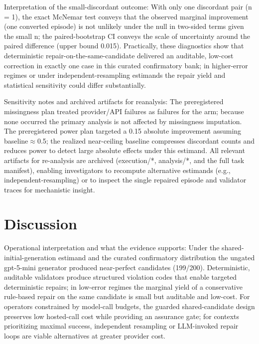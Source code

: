 \documentclass[conference]{IEEEtran}
\begin{document}
Interpretation of the small-discordant outcome: With only one discordant pair (n = 1), the exact McNemar test conveys that the observed marginal improvement (one converted episode) is not unlikely under the null in two-sided terms given the small n; the paired-bootstrap CI conveys the scale of uncertainty around the paired difference (upper bound 0.015). Practically, these diagnostics show that deterministic repair-on-the-same-candidate delivered an auditable, low-cost correction in exactly one case in this curated confirmatory bank; in higher-error regimes or under independent-resampling estimands the repair yield and statistical sensitivity could differ substantially.

Sensitivity notes and archived artifacts for reanalysis: The preregistered missingness plan treated provider/API failures as failures for the arm; because none occurred the primary analysis is not affected by missingness imputation. The preregistered power plan targeted a 0.15 absolute improvement assuming baseline\ensuremath{\approx}0.5; the realized near-ceiling baseline compresses discordant counts and reduces power to detect large absolute effects under this estimand. All relevant artifacts for re-analysis are archived (execution/*, analysis/*, and the full task manifest), enabling investigators to recompute alternative estimands (e.g., independent-resampling) or to inspect the single repaired episode and validator traces for mechanistic insight.

\section{Discussion}
Operational interpretation and what the evidence supports: Under the shared-initial-generation estimand and the curated confirmatory distribution the ungated gpt-5-mini generator produced near-perfect candidates (199/200). Deterministic, auditable validators produce structured violation codes that enable targeted deterministic repairs; in low-error regimes the marginal yield of a conservative rule-based repair on the same candidate is small but auditable and low-cost. For operators constrained by model-call budgets, the guarded shared-candidate design preserves low hosted-call cost while providing an assurance gate; for contexts prioritizing maximal success, independent resampling or LLM-invoked repair loops are viable alternatives at greater provider cost.
\end{document}
